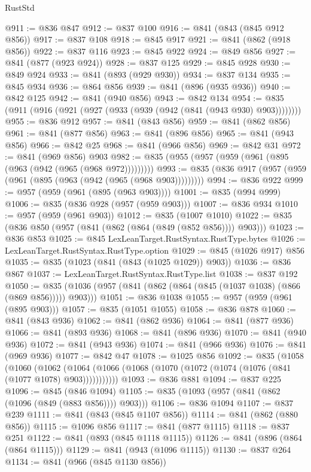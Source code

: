 \begin{lexlean}{RustStd}
\begin{coremodule}
@911 := @836 @847
@912 := @837 @100
@916 := @841 (@843 (@845 @912 @856))
@917 := @837 @108
@918 := @845 @917
@921 := @841 (@862 (@918 @856))
@922 := @837 @116
@923 := @845 @922
@924 := @849 @856
@927 := @841 (@877 (@923 @924))
@928 := @837 @125
@929 := @845 @928
@930 := @849 @924
@933 := @841 (@893 (@929 @930))
@934 := @837 @134
@935 := @845 @934
@936 := @864 @856
@939 := @841 (@896 (@935 @936))
@940 := @842 @125
@942 := @841 (@940 @856)
@943 := @842 @134
@954 := @835 (@911 (@916 (@921 (@927 (@933 (@939 (@942 (@841 (@943 @930) @903))))))))
@955 := @836 @912
@957 := @841 (@843 @856)
@959 := @841 (@862 @856)
@961 := @841 (@877 @856)
@963 := @841 (@896 @856)
@965 := @841 (@943 @856)
@966 := @842 @25
@968 := @841 (@966 @856)
@969 := @842 @31
@972 := @841 (@969 @856) @903
@982 := @835 (@955 (@957 (@959 (@961 (@895 (@963 (@942 (@965 (@968 @972)))))))))
@993 := @835 (@836 @917 (@957 (@959 (@961 (@895 (@963 (@942 (@965 (@968 @903)))))))))
@994 := @836 @922
@999 := @957 (@959 (@961 (@895 (@963 @903))))
@1001 := @835 (@994 @999)
@1006 := @835 (@836 @928 (@957 (@959 @903)))
@1007 := @836 @934
@1010 := @957 (@959 (@961 @903))
@1012 := @835 (@1007 @1010)
@1022 := @835 (@836 @850 (@957 (@841 (@862 (@864 (@849 (@852 @856)))) @903)))
@1023 := @836 @853
@1025 := @845 LexLeanTarget.RustSyntax.RustType.bytes
@1026 := LexLeanTarget.RustSyntax.RustType.option
@1029 := @845 (@1026 @917) @856
@1035 := @835 (@1023 (@841 (@843 (@1025 @1029)) @903))
@1036 := @836 @867
@1037 := LexLeanTarget.RustSyntax.RustType.list
@1038 := @837 @192
@1050 := @835 (@1036 (@957 (@841 (@862 (@864 (@845 (@1037 @1038) (@866 (@869 @856))))) @903)))
@1051 := @836 @1038
@1055 := @957 (@959 (@961 (@895 @903)))
@1057 := @835 (@1051 @1055)
@1058 := @836 @878
@1060 := @841 (@843 @936)
@1062 := @841 (@862 @936)
@1064 := @841 (@877 @936)
@1066 := @841 (@893 @936)
@1068 := @841 (@896 @936)
@1070 := @841 (@940 @936)
@1072 := @841 (@943 @936)
@1074 := @841 (@966 @936)
@1076 := @841 (@969 @936)
@1077 := @842 @47
@1078 := @1025 @856
@1092 := @835
    (@1058
      (@1060
        (@1062 (@1064 (@1066 (@1068 (@1070 (@1072 (@1074 (@1076 (@841 (@1077 @1078) @903)))))))))))
@1093 := @836 @881
@1094 := @837 @225
@1096 := @845 (@846 @1094)
@1105 := @835 (@1093 (@957 (@841 (@862 (@1096 (@849 (@883 @856)))) @903)))
@1106 := @836 @1094
@1107 := @837 @239
@1111 := @841 (@843 (@845 @1107 @856))
@1114 := @841 (@862 (@880 @856))
@1115 := @1096 @856
@1117 := @841 (@877 @1115)
@1118 := @837 @251
@1122 := @841 (@893 (@845 @1118 @1115))
@1126 := @841 (@896 (@864 (@864 @1115)))
@1129 := @841 (@943 (@1096 @1115))
@1130 := @837 @264
@1134 := @841 (@966 (@845 @1130 @856))

\end{coremodule}
\end{lexlean}
